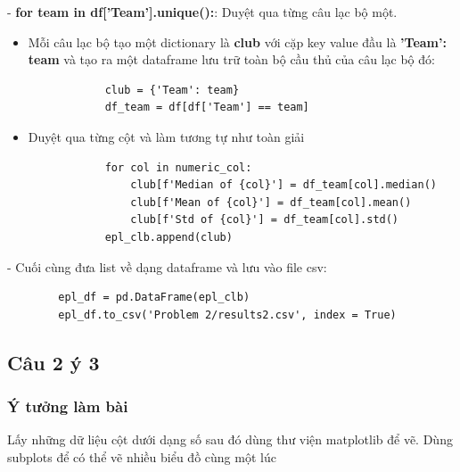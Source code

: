     - \textbf{for team in df['Team'].unique():}: Duyệt qua từng câu lạc bộ một.
    \begin{itemize}
        \item Mỗi câu lạc bộ tạo một dictionary là \textbf{club} với cặp key value đầu là \textbf{'Team': team} và tạo ra một dataframe lưu trữ toàn bộ cầu thủ của câu lạc bộ đó:
        \begin{verbatim}
            club = {'Team': team}
            df_team = df[df['Team'] == team]
        \end{verbatim}
        \item Duyệt qua từng cột và làm tương tự như toàn giải
        \begin{verbatim}
            for col in numeric_col:
                club[f'Median of {col}'] = df_team[col].median()
                club[f'Mean of {col}'] = df_team[col].mean()
                club[f'Std of {col}'] = df_team[col].std()
            epl_clb.append(club)
        \end{verbatim}
    \end{itemize}
    - Cuối cùng đưa list về dạng dataframe và lưu vào file csv:
    \begin{verbatim}
        epl_df = pd.DataFrame(epl_clb)
        epl_df.to_csv('Problem 2/results2.csv', index = True)
    \end{verbatim}

\subsection{Câu 2 ý 3}
\subsubsection{Ý tưởng làm bài}
Lấy những dữ liệu cột dưới dạng số sau đó dùng thư viện matplotlib để vẽ. Dùng subplots để có thể vẽ nhiều biểu đồ cùng một lúc
